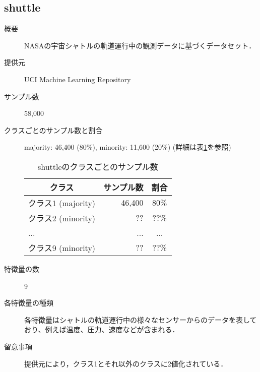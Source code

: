 \subsection{shuttle}
\begin{description}
    \item[概要] NASAの宇宙シャトルの軌道運行中の観測データに基づくデータセット．\cite{shuttle}
    \item[提供元] UCI Machine Learning Repository
    \item[サンプル数] 58,000
    \item[クラスごとのサンプル数と割合] majority: 46,400 (80\%), minority: 11,600 (20\%) (詳細は表\ref{tab:shuttle}を参照)

        \begin{table}
            \centering
            \caption{shuttleのクラスごとのサンプル数}
            \label{tab:shuttle}
            \begin{tabular}{lrc} \hline
                \multicolumn{1}{c}{クラス}&
                \multicolumn{1}{c}{サンプル数}&
                \multicolumn{1}{c}{割合}\\
                \hline
                \hline
                クラス1 (majority)& 46,400 & 80\% \\
                クラス2 (minority)& ?? & ??\% \\
                ... & ... & ... \\
                クラス9 (minority)& ?? & ??\% \\
                \hline
            \end{tabular}
        \end{table}

    \item[特徴量の数] 9
    \item[各特徴量の種類] \mbox{}
        各特徴量はシャトルの軌道運行中の様々なセンサーからのデータを表しており、例えば温度、圧力、速度などが含まれる．
    \item[留意事項] 提供元により，クラス1とそれ以外のクラスに2値化されている．
\end{description}



